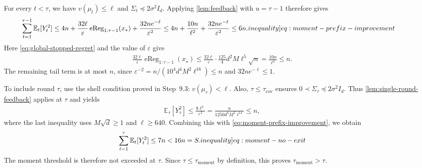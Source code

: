 \documentclass[12pt,cleveref]{jmlr}
\newcommand{\ineqlabel}[1]{\label[inequality]{#1}}
\newcommand{\E}{\mathbb E}
\newcommand{\1}{\mathbf 1}
\newcommand{\eps}{\varepsilon}
\begin{document}
For every $t<\tau$, we have $v(\mu_t)\leq\ell$ and
$\Sigma_t\preceq2\sigma^2I_d$.
Applying \cref{lem:feedback} with $u=\tau-1$ therefore gives
\begin{align}
    \sum_{t=1}^{\tau-1}\E_t[Y_t^2]
    & \leq4n+\frac{32\ell}{\eps}
    \operatorname{eReg}_{1:\tau-1}(x_\star)
    +\frac{32ne^{-\ell}}{\eps^2}
    \leq4n+\frac{10n}{\ell^2}
    +\frac{32ne^{-\ell}}{\eps^2}
    \leq6n.
    \ineqlabel{eq:moment-prefix-improvement}
\end{align}
Here \cref{eq:global-stopped-regret} and the value of $\eps$ give
\begin{align}
    \frac{32\ell}{\eps}\operatorname{eReg}_{1:\tau-1}(x_\star)
    \leq\frac{32\ell}{\eps}\cdot\frac{125}{4}d^2M\ell^5\sqrt n
    =\frac{10n}{\ell^2}\leq n.
\end{align}
The remaining tail term is at most $n$, since
$\eps^{-2}=n/(10^4d^4M^2\ell^{16})\leq n$ and
$32ne^{-\ell}\leq1$.

To include round $\tau$, use the shell condition proved in Step~9.3:
$v(\mu_\tau)<\ell$.
Also, $\tau\leq\tau_{\mathrm{cov}}$ ensures
$0\prec\Sigma_\tau\preceq2\sigma^2I_d$.
Thus \cref{lem:single-round-feedback} applies at $\tau$ and yields
\begin{align}
    \E_\tau[Y_\tau^2]
    \leq\frac{8\ell^2}{\eps^2}
    =\frac{n}{1250d^4M^2\ell^{14}}
    \leq n,
\end{align}
where the last inequality uses $M\sqrt d\geq1$ and $\ell\geq640$.
Combining this with \cref{eq:moment-prefix-improvement}, we obtain
\begin{align}
    \sum_{t=1}^{\tau}\E_t[Y_t^2]\leq7n<16n=S.
    \ineqlabel{eq:moment-no-exit}
\end{align}
The moment threshold is therefore not exceeded at $\tau$.
Since $\tau\leq\tau_{\mathrm{moment}}$ by definition,
this proves $\tau_{\mathrm{moment}}>\tau$.
\end{document}
